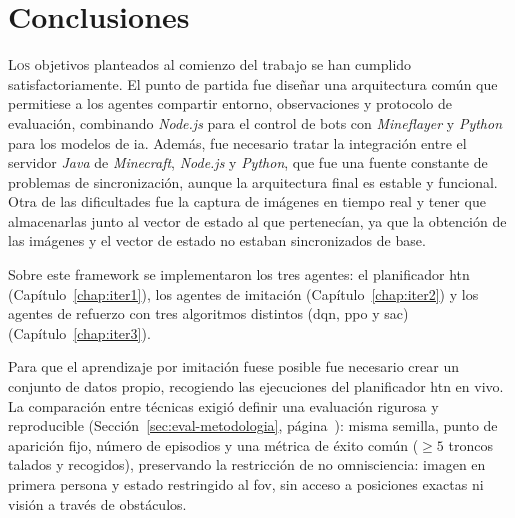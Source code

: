 \chapter{Conclusiones}
\label{chap:conclusions}

\lettrine{L}{os} objetivos planteados al comienzo del trabajo se han cumplido satisfactoriamente.
El punto de partida fue diseñar una arquitectura común que permitiese a los agentes
compartir entorno, observaciones y protocolo de evaluación, combinando
\textit{Node.js} para el control de bots con \textit{Mineflayer}
y \textit{Python} para los modelos de \gls{ia}.
Además, fue necesario tratar la integración entre el servidor \textit{Java} de \textit{Minecraft},
\textit{Node.js} y \textit{Python}, que fue una fuente constante de problemas de sincronización, aunque la arquitectura final es estable y funcional.
Otra de las dificultades fue la captura de imágenes en tiempo real y tener que almacenarlas junto al
vector de estado al que pertenecían, ya que la obtención de las imágenes y el vector de estado no estaban
sincronizados de base.

Sobre este \gls{framework} se implementaron los tres
agentes: el planificador \gls{htn} (Capítulo~\ref{chap:iter1}), los agentes de imitación
(Capítulo~\ref{chap:iter2}) y los agentes de refuerzo con tres algoritmos distintos
(\gls{dqn}, \gls{ppo} y \gls{sac}) (Capítulo~\ref{chap:iter3}).

Para que el aprendizaje por imitación fuese posible fue necesario crear un conjunto de datos
propio, recogiendo las ejecuciones del planificador \gls{htn} en vivo. 
La comparación entre técnicas exigió definir una evaluación rigurosa y
reproducible (Sección~\ref{sec:eval-metodologia}, página~\pageref{sec:eval-metodologia}):
misma semilla, punto de aparición fijo, número de episodios y una métrica de éxito común
($\geq \num{5}$ troncos talados y recogidos), 
preservando la restricción de no omnisciencia: imagen en primera persona y estado restringido
al \gls{fov}, sin acceso a posiciones exactas ni visión a través de obstáculos.

